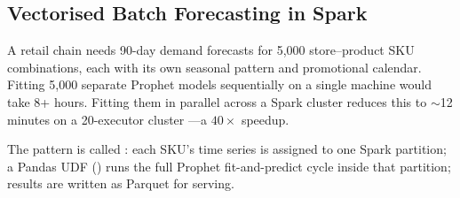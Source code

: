 \subsection{Vectorised Batch Forecasting in Spark}
\label{subsec:spark-prophet}

A retail chain needs 90-day demand forecasts for 5{,}000 store--product
SKU combinations, each with its own seasonal pattern and promotional
calendar. Fitting 5{,}000 separate Prophet models sequentially on a
single machine would take 8+ hours. Fitting them in parallel across a
Spark cluster reduces this to $\sim$12 minutes on a 20-executor cluster
---a $40\times$ speedup.

The pattern is called : each SKU's
time series is assigned to one Spark partition; a Pandas UDF
() runs the full Prophet fit-and-predict cycle
inside that partition; results are written as Parquet for serving.

